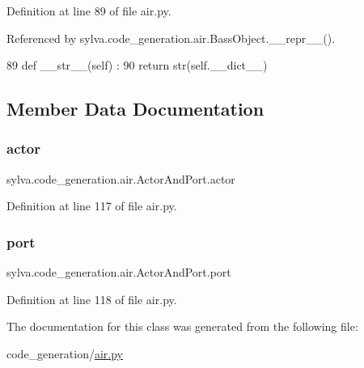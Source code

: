 Definition at line 89 of file air.\+py.



Referenced by sylva.\+code\+\_\+generation.\+air.\+Bass\+Object.\+\_\+\+\_\+repr\+\_\+\+\_\+().


\begin{DoxyCode}
89   \textcolor{keyword}{def }\_\_str\_\_(self) :
90     \textcolor{keywordflow}{return} str(self.\_\_dict\_\_)
\end{DoxyCode}


\subsection{Member Data Documentation}
\mbox{\label{classsylva_1_1code__generation_1_1air_1_1_actor_and_port_ae75bb4b57c6e2238f8f2fdadbc52311a}} 
\subsubsection{\texorpdfstring{actor}{actor}}
{\footnotesize\ttfamily sylva.\+code\+\_\+generation.\+air.\+Actor\+And\+Port.\+actor}



Definition at line 117 of file air.\+py.

\mbox{\label{classsylva_1_1code__generation_1_1air_1_1_actor_and_port_a2401a1fc2b007251a2ed4918b484d687}} 
\subsubsection{\texorpdfstring{port}{port}}
{\footnotesize\ttfamily sylva.\+code\+\_\+generation.\+air.\+Actor\+And\+Port.\+port}



Definition at line 118 of file air.\+py.



The documentation for this class was generated from the following file\+:\begin{DoxyCompactItemize}
\item 
code\+\_\+generation/\hyperlink{air_8py}{air.\+py}\end{DoxyCompactItemize}
